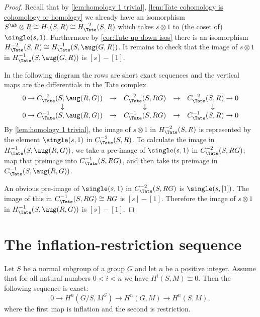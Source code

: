 \begin{proof}
	Recall that by \ref{lem:homology 1 trivial}, \ref{lem:Tate cohomology is cohomology or homology}
	we already have an isomorphism
	$S^\ab \otimes R \cong H_1(S,R) \cong H^{-2}_{\Tate}(S,R)$ which takes $s \otimes 1$ to
	(the coset of) $\single(s,1)$.
	Furthermore by \ref{cor:Tate up down isos} there is an isomorphism
	$H^{-2}_{\Tate}(S,R) \cong H^{-1}_{\Tate}(S,\aug(G,R))$.
	It remains to check that the image of $s \otimes 1$ in $H^{-1}_{\Tate}(S,\aug(G,R))$ is
	$[s]-[1]$.

	In the following diagram the rows are short exact sequences and the vertical maps are
	the differentials in the Tate complex.
	\[
		\begin{matrix}
			0 \to C^{-2}_{\Tate}(S,\aug(R,G)) & \to & C^{-2}_{\Tate}(S,RG) & \to &C^{-2}_{\Tate}(S,R) \to 0\\
			\downarrow & &\downarrow & &\downarrow \\
			0 \to C^{-1}_{\Tate}(S,\aug(R,G)) & \to & C^{-1}_{\Tate}(S,RG) & \to &C^{-1}_{\Tate}(S,R) \to 0
		\end{matrix}
	\]
	By \ref{lem:homology 1 trivial}, the image of $s \otimes 1$ in $H^{-2}_{\Tate}(S,R)$ is
	represented by the element $\single(s,1)$
	in $C^{-2}_{\Tate}(S,R)$.
	To calculate the image in $H^{-1}_{\Tate}(S,\aug(R,G))$, we take a pre-image of $\single(s,1)$
	in $C^{-2}_{\Tate}(S,RG)$; map that preimage into $C^{-1}_{\Tate}(S,RG)$, and then take its
	preimage in $C^{-1}_{\Tate}(S,\aug(R,G))$.

	An obvious pre-image of $\single(s,1)$ in $C^{-2}_{\Tate}(S,RG)$ is $\single(s,[1])$.
	The image of this in $C^{-1}_{\Tate}(S,RG) \cong RG$ is $[s]-[1]$.
	Therefore the image of $s \otimes 1$ in $H^{-1}_{\Tate}(S,\aug(R,G))$ is $[s]-[1]$.
\end{proof}




\section{The inflation-restriction sequence}

\begin{theorem}
	\label{thm:inflation restriction sequence}
	\leanok
	Let $S$ be a normal subgroup of a group $G$ and let $n$ be a positive integer.
	Assume that for all natural numbers $0 <i < n$ we have $H^{i}(S,M) \cong 0$.
	Then the following sequence is exact:
	\[
		0 \to H^{n}(G/S, M^S) \to H^{n}(G,M) \to H^{n}(S,M),
	\]
	where the first map is inflation and the second is restriction.
\end{theorem}


